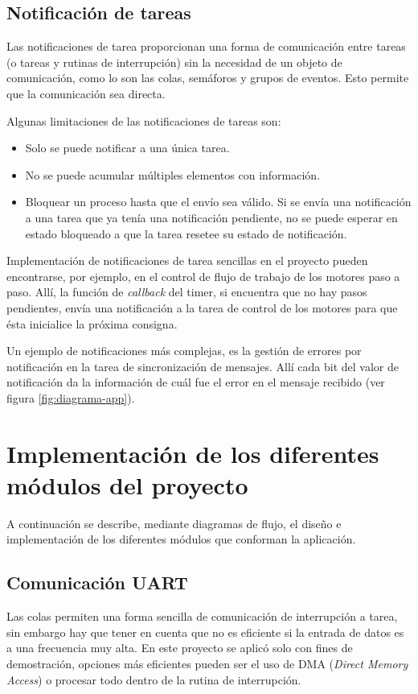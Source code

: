 \documentclass{IEEEtran}
\begin{document}
\subsection{Notificación de tareas}
Las notificaciones de tarea proporcionan una forma de comunicación entre tareas (o tareas y rutinas de interrupción) sin la necesidad de un objeto de comunicación, como lo son las colas, semáforos y grupos de eventos. Esto permite que la comunicación sea directa.

Algunas limitaciones de las notificaciones de tareas son:

\begin{itemize}
    \item Solo se puede notificar a una única tarea.
    \item No se puede acumular múltiples elementos con información.
    \item Bloquear un proceso hasta que el envío sea válido. Si se envía una notificación a una tarea que ya tenía una notificación pendiente, no se puede esperar en estado bloqueado a que la tarea resetee su estado de notificación.
\end{itemize}

Implementación de notificaciones de tarea sencillas en el proyecto pueden encontrarse, por ejemplo, en el control de flujo de trabajo de los motores paso a paso. Allí, la función de \textit{callback} del timer, si encuentra que no hay pasos pendientes, envía una notificación a la tarea de control de los motores para que ésta inicialice la próxima consigna.

Un ejemplo de notificaciones más complejas, es la gestión de errores por notificación en la tarea de sincronización de mensajes. Allí cada bit del valor de notificación da la información de cuál fue el error en el mensaje recibido (ver figura \ref{fig:diagrama-app}).

\section{Implementación de los diferentes módulos del proyecto}
\label{sec:modulos}

A continuación se describe, mediante diagramas de flujo, el diseño e implementación de los diferentes módulos que conforman la aplicación.

\subsection{Comunicación UART}
\label{sec:uart}
Las colas permiten una forma sencilla de comunicación de interrupción a tarea, sin embargo hay que tener en cuenta que no es eficiente si la entrada de datos es a una frecuencia muy alta. En este proyecto se aplicó solo con fines de demostración, opciones más eficientes pueden ser el uso de DMA (\textit{Direct Memory Access}) o procesar todo dentro de la rutina de interrupción.
\end{document}

